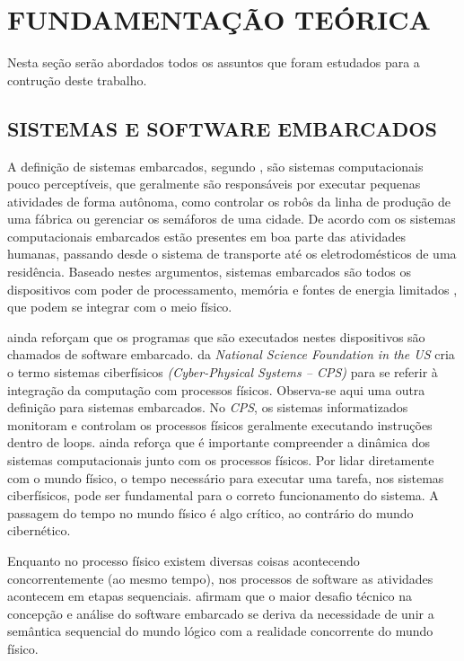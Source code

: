 \chapter{FUNDAMENTAÇÃO TEÓRICA}\label{CAP4}
Nesta seção serão abordados todos os assuntos que foram estudados para a contrução deste trabalho.
\section{SISTEMAS E SOFTWARE EMBARCADOS}\label{secaosistemasembarcados}
A definição de sistemas embarcados, segundo , são sistemas computacionais pouco perceptíveis, que geralmente são responsáveis por executar pequenas atividades de forma autônoma, como controlar os robôs da linha de produção de uma fábrica ou gerenciar os semáforos de uma cidade. De acordo com  os sistemas computacionais embarcados estão presentes em boa parte das atividades humanas, passando desde o sistema de transporte até os eletrodomésticos de uma residência. Baseado nestes argumentos, sistemas embarcados são todos os dispositivos com poder de processamento, memória e fontes de energia limitados \cite{leeseshia}, que podem se integrar com o meio físico.

 ainda reforçam que os programas que são executados nestes dispositivos são chamados de software embarcado.  da \textit{National Science Foundation in the US} cria o termo sistemas ciberfísicos \textit{(Cyber-Physical Systems – CPS)} para se referir à integração da computação com processos físicos. Observa-se aqui uma outra definição para sistemas embarcados. No \textit{CPS}, os sistemas informatizados monitoram e controlam os processos físicos geralmente executando instruções dentro de loops.  ainda reforça que é importante compreender a dinâmica dos sistemas computacionais junto com os processos físicos. Por lidar diretamente com o mundo físico, o tempo necessário para executar uma tarefa, nos sistemas ciberfísicos, pode ser fundamental para o correto funcionamento do sistema. A passagem do tempo no mundo físico é algo crítico, ao contrário do mundo cibernético.

Enquanto no processo físico existem diversas coisas acontecendo concorrentemente (ao mesmo tempo), nos processos de software as atividades acontecem em etapas sequenciais.  afirmam que o maior desafio técnico na concepção e análise do software embarcado se deriva da necessidade de unir a semântica sequencial do mundo lógico com a realidade concorrente do mundo físico.

